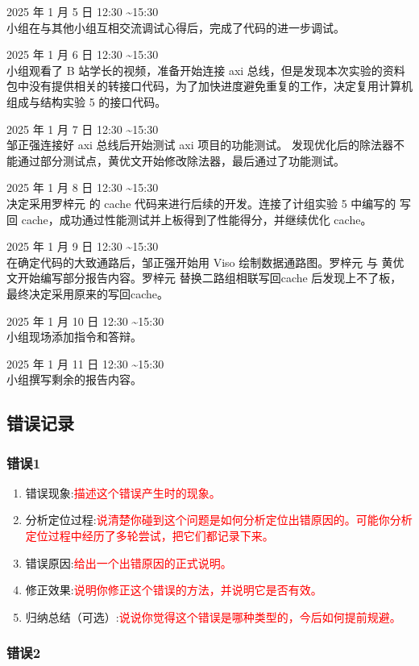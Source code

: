 {2025 年 1 月 5 日 12:30 \sim 15:30\\
小组在与其他小组互相交流调试心得后，完成了代码的进一步调试。

2025 年 1 月 6 日 12:30 \sim 15:30\\
小组观看了 B 站学长的视频，准备开始连接 axi 总线，但是发现本次实验的资料包中没有提供相关的转接口代码，为了加快进度避免重复的工作，决定复用计算机组成与结构实验 5 的接口代码。

2025 年 1 月 7 日 12:30 \sim 15:30\\
邹正强连接好 axi 总线后开始测试 axi 项目的功能测试。 发现优化后的除法器不能通过部分测试点，黄优文开始修改除法器，最后通过了功能测试。

2025 年 1 月 8 日 12:30 \sim 15:30\\
决定采用罗梓元 的 cache 代码来进行后续的开发。连接了计组实验 5 中编写的 写回 cache，成功通过性能测试并上板得到了性能得分，并继续优化 cache。

2025 年 1 月 9 日 12:30 \sim 15:30\\
在确定代码的大致通路后，邹正强开始用 Viso 绘制数据通路图。罗梓元 与 黄优文开始编写部分报告内容。罗梓元 替换二路组相联写回cache 后发现上不了板，最终决定采用原来的写回cache。

2025 年 1 月 10 日 12:30 \sim 15:30\\
小组现场添加指令和答辩。

2025 年 1 月 11 日 12:30 \sim 15:30\\
小组撰写剩余的报告内容。
}

\subsection{错误记录}

\subsubsection{错误1}
\begin{enumerate}[(1)]
    \item 错误现象:\textcolor{red}{描述这个错误产生时的现象。}
    \item 分析定位过程:\textcolor{red}{说清楚你碰到这个问题是如何分析定位出错原因的。可能你分析定位过程中经历了多轮尝试，把它们都记录下来。}
    \item 错误原因:\textcolor{red}{给出一个出错原因的正式说明。}
    \item 修正效果:\textcolor{red}{说明你修正这个错误的方法，并说明它是否有效。}
    \item 归纳总结（可选）:\textcolor{red}{说说你觉得这个错误是哪种类型的，今后如何提前规避。}
\end{enumerate}

\subsubsection{错误2}